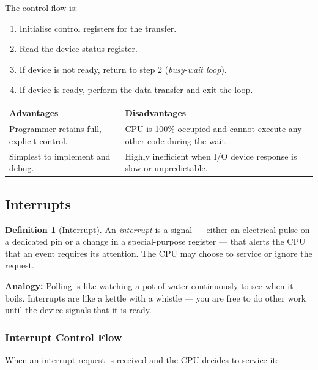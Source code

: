 \documentclass[11pt, a4paper, notitlepage]{report}
\theoremstyle{definition}
\newtheorem{definition}[theorem]{Definition}
\theoremstyle{remark}
\theoremstyle{definition}
\begin{document}
The control flow is:

\begin{enumerate}
  \item Initialise control registers for the transfer.
  \item Read the device status register.
  \item If device is not ready, return to step 2 (\emph{busy-wait loop}).
  \item If device is ready, perform the data transfer and exit the loop.
\end{enumerate}

\begin{center}
\renewcommand{\arraystretch}{1.3}
\begin{tabular}{p{} p{}}
  \toprule
  \textbf{Advantages} & \textbf{Disadvantages} \\
  \midrule
  Programmer retains full, explicit control. &
  CPU is 100\% occupied and cannot execute any other code during the wait. \\
  Simplest to implement and debug. &
  Highly inefficient when I/O device response is slow or unpredictable. \\
  \bottomrule
\end{tabular}
\end{center}

\subsection{Interrupts}
\label{sec:interrupts}

\begin{definition}[Interrupt]
  \label{def:interrupt}
  An \emph{interrupt} is a signal — either an electrical pulse on a dedicated pin or a change in a special-purpose register — that alerts the CPU that an event requires its attention. The CPU may choose to service or ignore the request.
\end{definition}

\textbf{Analogy:} Polling is like watching a pot of water continuously to see when it boils. Interrupts are like a kettle with a whistle — you are free to do other work until the device signals that it is ready.

\subsubsection{Interrupt Control Flow}
\label{sec:interrupt-flow}

When an interrupt request is received and the CPU decides to service it:
\end{document}
